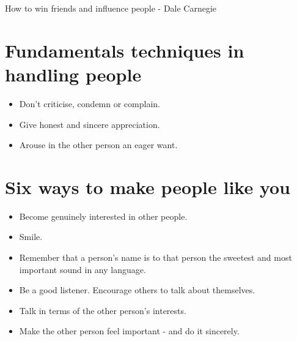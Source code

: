\documentclass[10pt,portrait]{article}
\begin{document}
  \footnotesize
  \pagestyle{empty}
  
    \begin{center}
      \Huge{How to win friends and influence people - Dale Carnegie}
    \end{center}
    
    \section*{Fundamentals techniques in handling people}
    \begin{itemize}
      \item Don't criticise, condemn or complain.
      \item Give honest and sincere appreciation.
      \item Arouse in the other person an eager want.
    \end{itemize}
    
    \section*{Six ways to make people like you}
    \begin{itemize}
      \item Become genuinely interested in other people.
      \item Smile.
      \item Remember that a person's name is to that person the sweetest and most important sound in any language.
      \item Be a good listener. Encourage others to talk about themselves.
      \item Talk in terms of the other person's interests.
      \item Make the other person feel important - and do it sincerely.
    \end{itemize}
    
\end{document}
